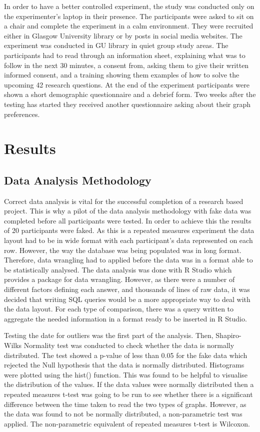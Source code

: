 \documentclass{l4proj}
\begin{document}
In order to have a better controlled experiment, the study was conducted only on the experimenter's laptop in their presence. The participants were asked to sit on a chair and complete the experiment in a calm environment. They were recruited either in Glasgow University library or by posts in social media websites. The experiment was conducted in GU library in quiet group study areas. The participants had to read through an information sheet, explaining what was to follow in the next 30 minutes, a consent from, asking them to give their written informed consent, and a training showing them examples of how to solve the upcoming 42 research questions. At the end of the experiment participants were shown a short demographic questionnaire and a debrief form. Two weeks after the testing has started they received another questionnaire asking about their graph preferences.


\section{Results}

\subsection{Data Analysis Methodology}

Correct data analysis is vital for the successful completion of a research based project. This is why a pilot of the data analysis methodology with fake data was completed before all participants were tested. In order to achieve this the results of 20 participants were faked. As this is a repeated measures experiment the data layout had to be in wide format with each participant's data represented on each row. However, the way the database was being populated was in long format. Therefore, data wrangling had to applied before the data was in a format able to be statistically analysed. The data analysis was done with R Studio which provides a package for data wrangling. However, as there were a number of different factors defining each answer, and thousands of lines of raw data, it was decided that writing SQL queries would be a more appropriate way to deal with the data layout. For each type of comparison, there was a query written to aggregate the needed information in a format ready to be inserted in R Studio. 

Testing the date for outliers was the first part of the analysis. Then, Shapiro-Wilks Normality test was conducted to check whether the data is normally distributed. The test showed a p-value of less than 0.05 for the fake data which rejected the Null hypothesis that the data is normally distributed. Histograms were plotted using the hist() function. This was found to be helpful to visualise the distribution of the values. If the data values were normally distributed then a repeated measures t-test was going to be run to see whether there is a significant difference between the time taken to read the two types of graphs. However, as the data was found to not be normally distributed, a non-parametric test was applied. The non-parametric equivalent of repeated measures t-test is Wilcoxon. 
\end{document}
